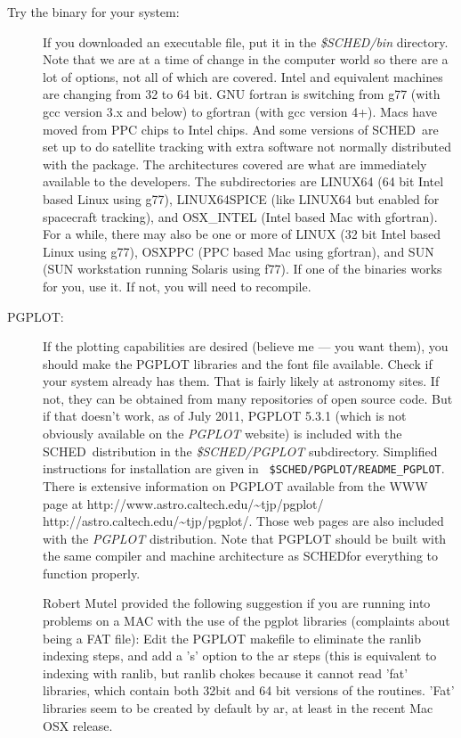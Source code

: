 \documentclass{report}
\newcommand{\sched}{{\sc SCHED}}
\newcommand{\schedb}{{\sc SCHED~}}
\begin{document}
\begin{description}
\item [Try the binary for your system:] If you downloaded an
executable file, put it in the {\sl \$SCHED/bin} directory.  Note that
we are at a time of change in the computer world so there are a lot of
options, not all of which are covered.  Intel and equivalent machines
are changing from 32 to 64 bit.  GNU fortran is switching from g77
(with gcc version 3.x and below) to gfortran (with gcc version 4+).
Macs have moved from PPC chips to Intel chips.  And some versions of
\schedb are set up to do satellite tracking with extra software not
normally distributed with the package.  The architectures covered are
what are immediately available to the developers.  The subdirectories
are LINUX64 (64 bit Intel based Linux using g77), LINUX64SPICE (like
LINUX64 but enabled for spacecraft tracking), and OSX\_INTEL (Intel
based Mac with gfortran).  For a while, there may also be one or more
of LINUX (32 bit Intel based Linux using g77), OSXPPC (PPC based Mac
using gfortran), and SUN (SUN workstation running Solaris using f77).
If one of the binaries works for you, use it.  If not, you will need
to recompile.

\item [{\sc PGPLOT:}] If the plotting capabilities are desired
(believe me --- you want them), you should make the {\sc PGPLOT}
libraries and the font file available.  Check if your system already
has them.  That is fairly likely at astronomy sites.  If not, they can
be obtained from many repositories of open source code.  But if that
doesn't work, as of July 2011, {\sc PGPLOT 5.3.1} (which is not
obviously available on the {\sl PGPLOT} website) is included with
the \schedb distribution in the {\sl \$SCHED/PGPLOT} subdirectory.
Simplified instructions for installation are given in {\tt
\$SCHED/PGPLOT/README\_PGPLOT}.  There is extensive information on {\sc
PGPLOT} available from the WWW page at \htmladdnormallink
{http://www.astro.caltech.edu/\~{}tjp/pgplot/}
{http://astro.caltech.edu/\~{}tjp/pgplot/}.  Those web pages are also
included with the {\sl PGPLOT} distribution.  Note that {\sc PGPLOT}
should be built with the same compiler and machine architecture as
\sched for everything to function properly.

Robert Mutel provided the following suggestion if you are running into
problems on a MAC with the use of the pgplot libraries (complaints
about being a FAT file): Edit the PGPLOT makefile to eliminate the
ranlib indexing steps, and add a 's' option to the ar steps (this is
equivalent to indexing with ranlib, but ranlib chokes because it
cannot read 'fat' libraries, which contain both 32bit and 64 bit
versions of the routines. 'Fat' libraries seem to be created by
default by ar, at least in the recent Mac OSX release.


\end{description}
\end{document}
